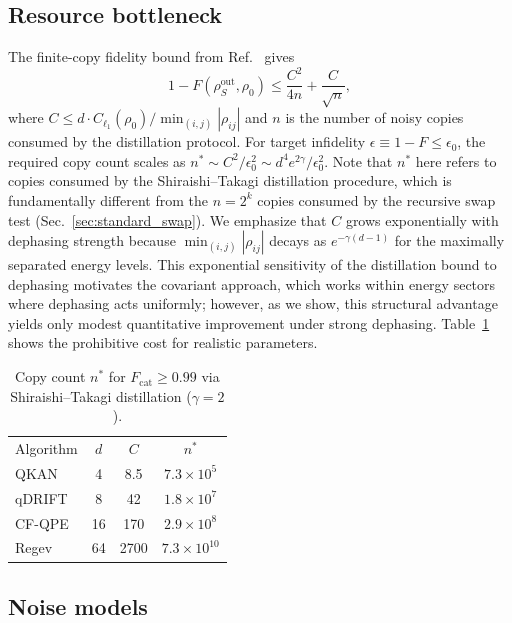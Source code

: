 \documentclass[prx,twocolumn,superscriptaddress,longbibliography,floatfix]{revtex4-2}
\begin{document}
\subsection{Resource bottleneck}
\label{sec:bottleneck}

The finite-copy fidelity bound from Ref.~\cite{Shiraishi2024} gives
\begin{equation}
1 - F(\rho_S^\mathrm{out}, \rho_0) \leq \frac{C^2}{4n} + \frac{C}{\sqrt{n}},
\label{eq:finite_n}
\end{equation}
where $C \leq d \cdot C_{\ell_1}(\rho_0) / \min_{(i,j)} |\rho_{ij}|$ and $n$ is the number of noisy copies consumed by the distillation protocol.
For target infidelity $\epsilon \equiv 1 - F \leq \epsilon_0$, the required copy count scales as $n^* \sim C^2/\epsilon_0^2 \sim d^4 e^{2\gamma}/\epsilon_0^2$.
Note that $n^*$ here refers to copies consumed by the Shiraishi--Takagi distillation procedure, which is fundamentally different from the $n = 2^k$ copies consumed by the recursive swap test (Sec.~\ref{sec:standard_swap}).
We emphasize that $C$ grows exponentially with dephasing strength because $\min_{(i,j)}|\rho_{ij}|$ decays as $e^{-\gamma(d-1)}$ for the maximally separated energy levels.
This exponential sensitivity of the distillation bound to dephasing motivates the covariant approach, which works within energy sectors where dephasing acts uniformly; however, as we show, this structural advantage yields only modest quantitative improvement under strong dephasing.
Table~\ref{tab:bottleneck} shows the prohibitive cost for realistic parameters.

\begin{table}[tb]
\caption{Copy count $n^*$ for $F_\mathrm{cat} \geq 0.99$ via Shiraishi--Takagi distillation ($\gamma = 2$).}
\label{tab:bottleneck}
\begin{ruledtabular}
\begin{tabular}{lccc}
Algorithm & $d$ & $C$ & $n^*$ \\
\colrule
QKAN & 4 & 8.5 & $7.3 \times 10^5$ \\
qDRIFT & 8 & 42 & $1.8 \times 10^7$ \\
CF-QPE & 16 & 170 & $2.9 \times 10^8$ \\
Regev & 64 & 2700 & $7.3 \times 10^{10}$ \\
\end{tabular}
\end{ruledtabular}
\end{table}

\subsection{Noise models}
\label{sec:noise_models}
\end{document}
